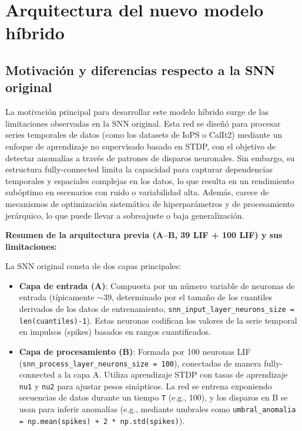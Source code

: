 \section{Arquitectura del nuevo modelo híbrido}

\subsection{ Motivación y diferencias respecto a la SNN original}

La motivación principal para desarrollar este modelo híbrido surge de las limitaciones observadas en la SNN original. Esta red se diseñó para procesar series temporales de datos (como los datasets de IoPS o CalIt2) mediante un enfoque de aprendizaje no supervisado basado en STDP, con el objetivo de detectar anomalías a través de patrones de disparos neuronales. Sin embargo, su estructura fully-connected limita la capacidad para capturar dependencias temporales y espaciales complejas en los datos, lo que resulta en un rendimiento subóptimo en escenarios con ruido o variabilidad alta. Además, carece de mecanismos de optimización sistemática de hiperparámetros y de procesamiento jerárquico, lo que puede llevar a sobreajuste o baja generalización.

\textbf{Resumen de la arquitectura previa (A--B, 39 LIF + 100 LIF) y sus limitaciones:}

La SNN original consta de dos capas principales:
\begin{itemize}
    \item \textbf{Capa de entrada (A)}: Compuesta por un número variable de neuronas de entrada (típicamente $\sim$39, determinado por el tamaño de los cuantiles derivados de los datos de entrenamiento, \texttt{snn\_input\_layer\_neurons\_size = len(cuantiles)-1}). Estas neuronas codifican los valores de la serie temporal en impulsos (spikes) basados en rangos cuantificados.
    \item \textbf{Capa de procesamiento (B)}: Formada por 100 neuronas LIF (\texttt{snn\_process\_layer\_neurons\_size = 100}), conectadas de manera fully-connected a la capa A. Utiliza aprendizaje STDP con tasas de aprendizaje \texttt{nu1} y \texttt{nu2} para ajustar pesos sinápticos. La red se entrena exponiendo secuencias de datos durante un tiempo \texttt{T} (e.g., 100), y los disparos en B se usan para inferir anomalías (e.g., mediante umbrales como \texttt{umbral\_anomalia = np.mean(spikes) + 2 * np.std(spikes)}).
\end{itemize}

